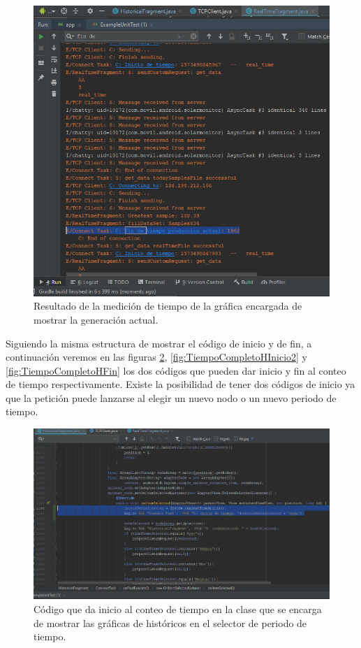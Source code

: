 \begin{figure}[H]
	\centering
	\includegraphics[scale=.6]{Capitulo5/images/TiempoCompletoPruebasGA.png}
	\caption{Resultado de la medición de tiempo de la gráfica encargada de mostrar la generación actual.}	\label{fig:TiempoCompletoGAResultado}
\end{figure} 

Siguiendo la misma estructura de mostrar el código de inicio y de fin, a continuación veremos en las figuras \ref{fig:TiempoCompletoHInicio}, \ref{fig:TiempoCompletoHInicio2} y \ref{fig:TiempoCompletoHFin} los dos códigos que pueden dar inicio y fin al conteo de tiempo respectivamente. Existe la posibilidad de tener dos códigos de inicio ya que la petición puede lanzarse al elegir un nuevo nodo o un nuevo periodo de tiempo. \\ \newline

\begin{figure}[H]
	\centering
	\includegraphics[scale=.6]{Capitulo5/images/TiempoCompletoCodigoInicioH.png}
	\caption{Código que da inicio al conteo de tiempo en la clase que se encarga de mostrar las gráficas de históricos en el selector de periodo de tiempo.}	\label{fig:TiempoCompletoHInicio}
\end{figure} 

